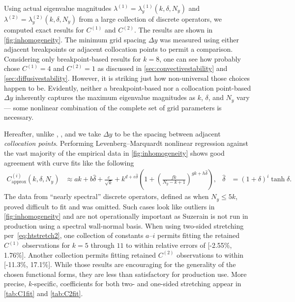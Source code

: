\documentclass[letterpaper,11pt,nointlimits,reqno,draft]{amsbook}
\begin{document}
Using actual eigenvalue magnitudes
$\lambda^{(1)}=\lambda^{(1)}_y\!\left(k,\delta,N_y\right)$ and
$\lambda^{(2)}=\lambda^{(2)}_y\!\left(k,\delta,N_y\right)$ from a large
collection of discrete operators, we computed exact results for $C^{(1)}$ and
$C^{(2)}$.  The results are shown in \autoref{fig:inhomogeneity}.  The
minimum grid spacing $\Delta{}y$ was measured using either adjacent breakpoints
or adjacent collocation points to permit a comparison.  Considering only
breakpoint-based results for $k=8$, one can see how \citet{Venugopal2003}
probably chose $C^{(1)}=4$ and $C^{(2)}=1$ as discussed in
\autoref{sec:convectivestability} and \autoref{sec:diffusivestability}.
However, it is striking just how non-universal those choices happen to be.
Evidently, neither a breakpoint-based nor a collocation point-based $\Delta{}y$
inherently captures the maximum eigenvalue magnitudes as $k$, $\delta$, and
$N_y$ vary--- some nonlinear combination of the complete set of grid parameters
is necessary.

Hereafter, unlike \citeauthor{Guarini1998}, \citeauthor{Kwok2002}, and
\citeauthor{Venugopal2003} we take $\Delta{}y$ to be the spacing between
adjacent \emph{collocation points}.  Performing Levenberg--Marquardt nonlinear
regression against the vast majority of the empirical data in
\autoref{fig:inhomogeneity} shows good agreement with curve fits like the
following
\begin{align}
  \label{eq:Cfit}
  C_\text{approx}^{(i)}\!\left(k,\delta,N_y\right)
  &\approx
    a k
  + b \hat\delta
  + \frac{c}{\sqrt{k}}
  + k^{d + e \hat\delta} \left(
        1 + \left(\frac{f k}{N_y - k + 1}\right)^{g k + h \hat\delta}
    \right)
  ,
  &
  \hat\delta &= \left(1+\delta\right)^i \tanh \delta
  .
\end{align}
The data from ``nearly spectral'' discrete operators, defined as when $N_y \leq
5 k$, proved difficult to fit and was omitted.  Such cases look like outliers
in \autoref{fig:inhomogeneity} and are not operationally important as
Suzerain is not run in production using a spectral wall-normal basis.  When
using two-sided stretching per~\eqref{eq:htstretch2}, one collection of
constants $a$--$i$ permits fitting the retained $C^{(1)}$ observations for
$k=5$ through $11$ to within relative errors of [-2.55\%, 1.76\%].  Another
collection permits fitting retained $C^{(2)}$ observations to within [-11.3\%,
17.1\%].  While those results are encouraging for the generality of the chosen
functional forms, they are less than satisfactory for production use.  More
precise, $k$-specific, coefficients for both two- and one-sided stretching
appear in \autoref{tab:C1fit} and \autoref{tab:C2fit}.
\end{document}
